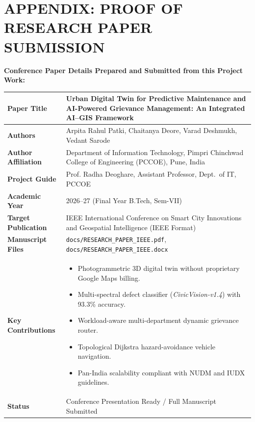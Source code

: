 \documentclass[12pt,a4paper]{report}
\begin{document}
\newpage
\chapter*{APPENDIX: PROOF OF RESEARCH PAPER SUBMISSION}

\noindent \textbf{Conference Paper Details Prepared and Submitted from this Project Work:}

\vspace{0.4cm}
\begin{table}[h]
\centering
\fontsize{10pt}{14pt}\selectfont
\begin{tabular}{|p{3.8cm}|p{11.2cm}|}
\hline
\textbf{Paper Title} & \textbf{Urban Digital Twin for Predictive Maintenance and AI-Powered Grievance Management: An Integrated AI--GIS Framework} \\
\hline
\textbf{Authors} & Arpita Rahul Patki, Chaitanya Deore, Varad Deshmukh, Vedant Sarode \\
\hline
\textbf{Author Affiliation} & Department of Information Technology, Pimpri Chinchwad College of Engineering (PCCOE), Pune, India \\
\hline
\textbf{Project Guide} & Prof. Radha Deoghare, Assistant Professor, Dept.\ of IT, PCCOE \\
\hline
\textbf{Academic Year} & 2026--27 (Final Year B.Tech, Sem-VII) \\
\hline
\textbf{Target Publication} & IEEE International Conference on Smart City Innovations and Geospatial Intelligence (IEEE Format) \\
\hline
\textbf{Manuscript Files} & \texttt{docs/RESEARCH\_PAPER\_IEEE.pdf}, \texttt{docs/RESEARCH\_PAPER\_IEEE.docx} \\
\hline
\textbf{Key Contributions} & \begin{itemize}[leftmargin=*,noitemsep,topsep=0pt]
    \item Photogrammetric 3D digital twin without proprietary Google Maps billing.
    \item Multi-spectral defect classifier (\textit{CivicVision-v1.4}) with 93.3\% accuracy.
    \item Workload-aware multi-department dynamic grievance router.
    \item Topological Dijkstra hazard-avoidance vehicle navigation.
    \item Pan-India scalability compliant with NUDM and IUDX guidelines.
\end{itemize} \\
\hline
\textbf{Status} & Conference Presentation Ready / Full Manuscript Submitted \\
\hline
\end{tabular}
\end{table}
\end{document}
